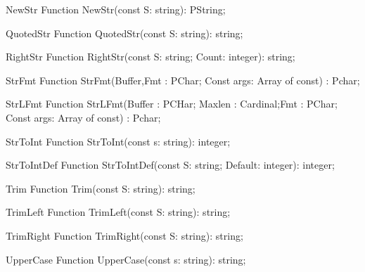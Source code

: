  
\begin{function}{NewStr}
\Declaration
Function NewStr(const S: string): PString;
\Description
\Errors
\SeeAlso
\end{function}

 
\begin{function}{QuotedStr}
\Declaration
Function QuotedStr(const S: string): string;
\Description
\Errors
\SeeAlso
\end{function}

 
\begin{function}{RightStr}
\Declaration
Function RightStr(const S: string; Count: integer): string;
\Description
\Errors
\SeeAlso
\end{function}

 
\begin{function}{StrFmt}
\Declaration
Function StrFmt(Buffer,Fmt : PChar; Const args: Array of const) : Pchar;
\Description
\Errors
\SeeAlso
\end{function}

 
\begin{function}{StrLFmt}
\Declaration
Function StrLFmt(Buffer : PCHar; Maxlen : Cardinal;Fmt : PChar; Const args: Array of const) : Pchar;
\Description
\Errors
\SeeAlso
\end{function}

 
\begin{function}{StrToInt}
\Declaration
Function StrToInt(const s: string): integer;
\Description
\Errors
\SeeAlso
\end{function}

 
\begin{function}{StrToIntDef}
\Declaration
Function StrToIntDef(const S: string; Default: integer): integer;
\Description
\Errors
\SeeAlso
\end{function}

 
\begin{function}{Trim}
\Declaration
Function Trim(const S: string): string;
\Description
\Errors
\SeeAlso
\end{function}

 
\begin{function}{TrimLeft}
\Declaration
Function TrimLeft(const S: string): string;
\Description
\Errors
\SeeAlso
\end{function}

 
\begin{function}{TrimRight}
\Declaration
Function TrimRight(const S: string): string;
\Description
\Errors
\SeeAlso
\end{function}

 
\begin{function}{UpperCase}
\Declaration
Function UpperCase(const s: string): string;
\Description
\Errors
\SeeAlso
\end{function}

 
